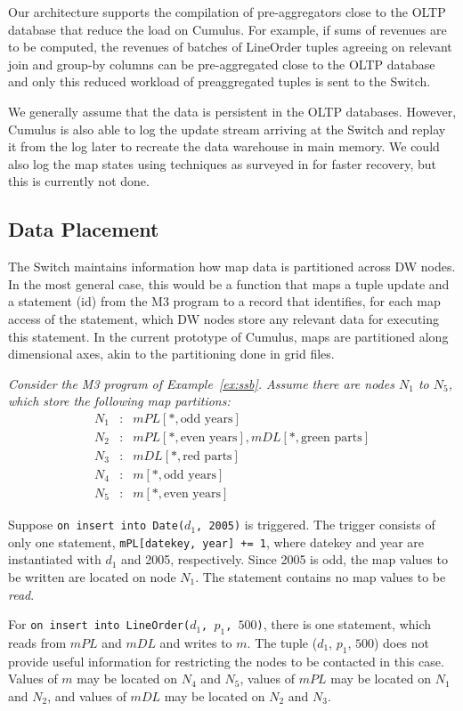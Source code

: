 Our architecture supports the compilation of pre-aggrega\-tors close to the
OLTP database that reduce the load on Cumulus. For example, if sums of revenues
are to be computed, the revenues of batches of LineOrder tuples agreeing
on relevant join and group-by columns can be pre-aggregated close to the OLTP database and only this reduced workload of preaggregated tuples is sent to the Switch.

We generally assume that the data is persistent in the OLTP databases.
However, Cumulus is also able to
log the update stream arriving at the Switch and replay it from the
log later to recreate the data warehouse in main memory.
We could also log the map states using techniques as surveyed in
\cite{DBLP:journals/pvldb/SallesCSDGKW09}
for faster recovery, but this is currently not done.



\subsection{Data Placement}


The Switch maintains information how map data is partitioned across
DW nodes. In the most general case, this would be a function
that maps a tuple update and a statement (id) from the M3 program to
a record that identifies, for each map access of the statement,
which DW nodes store any relevant data for executing this
statement.
%
In the current prototype of Cumulus, maps are partitioned along
dimensional axes, akin to the partitioning done in grid files\cite{318586}.


\begin{example}\em
\label{ex:switch_msg}
Consider the M3 program of Example~\ref{ex:ssb}.
Assume there are nodes $N_1$ to $N_5$,
which store the following map partitions:
\begin{eqnarray*}
N_1 &:& mPL[*, \mbox{odd years}] \\
N_2 &:& mPL[*, \mbox{even years}], mDL[*, \mbox{green parts}] \\ 
N_3 &:& mDL[*, \mbox{red parts}] \\ 
N_4 &:& m[*, \mbox{odd years}] \\
N_5 &:& m[*, \mbox{even years}]
\end{eqnarray*}

Suppose {\tt on insert into Date($d_1$, 2005)} is triggered.
The trigger consists of only one statement,
{\tt mPL[datekey, year] += 1}, where datekey and year are instantiated
with $d_1$ and 2005, respectively. Since 2005 is odd,
the map values to be written are located on node $N_1$.
The statement contains no map values to be {\em read}.

For {\tt on insert into LineOrder($d_1$, $p_1$, $500$)},
there is one statement, which reads from $mPL$ and $mDL$ and writes to $m$.
The tuple ($d_1$, $p_1$, $500$)
does not provide useful information for restricting the nodes to be contacted
in this case.
Values of $m$ may be located on $N_4$ and $N_5$, values of $mPL$ may be
located on $N_1$ and $N_2$, and values of $mDL$ may be located on $N_2$ and
$N_3$.
\punto
\end{example}


